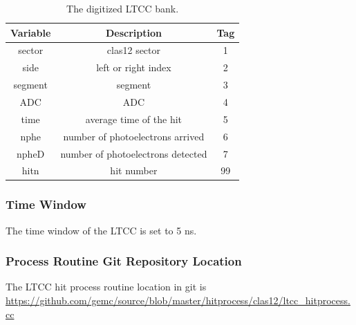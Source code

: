\begin{table}[h]
	\begin{center}
		\begin{tabular}{| c | c | c |}
			\hline \hline
			Variable    & Description                                        & Tag  \\
			\hline
             sector  &                                     clas12 sector  &    1 \\
               side  &                               left or right index  &    2 \\
            segment  &                                           segment  &    3 \\
                ADC  &                                               ADC  &    4 \\
               time  &                           average time of the hit  &    5 \\
               nphe  &                  number of photoelectrons arrived  &    6 \\
              npheD  &                 number of photoelectrons detected  &    7 \\
               hitn  &                                        hit number  &   99 \\
			\hline \hline
		\end{tabular}
	\end{center}
	\caption{The digitized LTCC bank.}\label{tab:ltccBank}
\end{table}

\subsubsection{Time Window}
The time window  of the LTCC is set to 5 ns.

\subsubsection{Process Routine Git Repository Location}
The LTCC hit process routine location in git is \url{https://github.com/gemc/source/blob/master/hitprocess/clas12/ltcc_hitprocess.cc}
